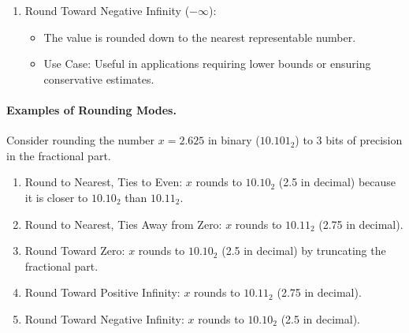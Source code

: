 \begin{enumerate}
    \item Round Toward Negative Infinity (\(-\infty\)):
    \begin{itemize}
        \item The value is rounded down to the nearest representable number.
        \item Use Case: Useful in applications requiring lower bounds or ensuring conservative estimates.
    \end{itemize}
\end{enumerate}

\paragraph{Examples of Rounding Modes.}
Consider rounding the number \( x = 2.625 \) in binary (\( 10.101_2 \)) to 3 bits of precision in the fractional part.

\begin{enumerate}
    \item Round to Nearest, Ties to Even:
     \( x \) rounds to \( 10.10_2 \) (2.5 in decimal) because it is closer to \( 10.10_2 \) than \( 10.11_2 \).
    \item Round to Nearest, Ties Away from Zero:
     \( x \) rounds to \( 10.11_2 \) (2.75 in decimal).
    \item Round Toward Zero:
     \( x \) rounds to \( 10.10_2 \) (2.5 in decimal) by truncating the fractional part.
    \item Round Toward Positive Infinity:
     \( x \) rounds to \( 10.11_2 \) (2.75 in decimal).
    \item Round Toward Negative Infinity:
     \( x \) rounds to \( 10.10_2 \) (2.5 in decimal).
\end{enumerate}

